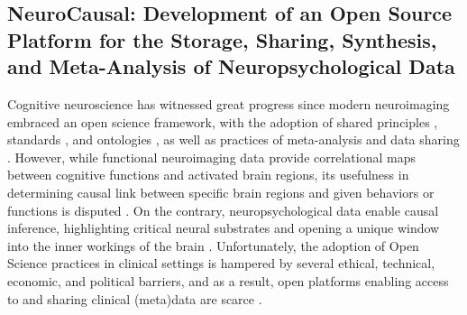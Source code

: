\documentclass[../main.tex]{subfiles}
\begin{document}
\subsection{NeuroCausal: Development of an Open Source Platform for the Storage, Sharing, Synthesis, and Meta-Analysis of Neuropsychological Data} 

%

Cognitive neuroscience has witnessed great progress since modern neuroimaging embraced an open science framework, with the adoption of shared principles \parencite{Wilkinson2016}, standards \parencite{gorgolewski_brain_2016}, and ontologies \parencite{poldrack_cognitive_2011}, as well as practices of meta-analysis\parencite{dockes_neuroquery_2020-1, yarkoni_large-scale_2011} and data sharing \parencite{gorgolewski_neurovaultorg_2015}. However, while functional neuroimaging data provide correlational maps between cognitive functions and activated brain regions, its usefulness in determining causal link between specific brain regions and given behaviors or functions is disputed \parencite{weber_functional_2010, siddiqi_causal_2022}. On the contrary, neuropsychological data enable causal inference, highlighting critical neural substrates and opening a unique window into the inner workings of the brain \parencite{price_evolution_2018}. Unfortunately, the adoption of Open Science practices in clinical settings is hampered by several ethical, technical, economic, and political barriers, and as a result, open platforms enabling access to and sharing clinical (meta)data are scarce \parencite{lariviere_enigma_2021}.
\end{document}
